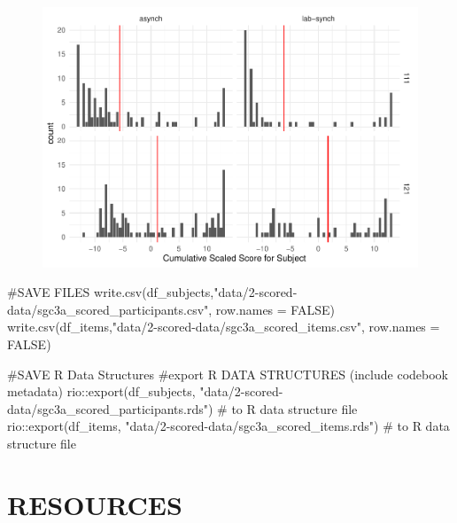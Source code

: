 \documentclass[
  letterpaper,
  DIV=11,
  numbers=noendperiod]{scrreprt}
\newenvironment{Shaded}{\begin{snugshade}}{\end{snugshade}}
\newcommand{\AttributeTok}[1]{\textcolor[rgb]{0.40,0.45,0.13}{#1}}
\newcommand{\CommentTok}[1]{\textcolor[rgb]{0.37,0.37,0.37}{#1}}
\newcommand{\ConstantTok}[1]{\textcolor[rgb]{0.56,0.35,0.01}{#1}}
\newcommand{\FunctionTok}[1]{\textcolor[rgb]{0.28,0.35,0.67}{#1}}
\newcommand{\NormalTok}[1]{\textcolor[rgb]{0.00,0.23,0.31}{#1}}
\newcommand{\SpecialCharTok}[1]{\textcolor[rgb]{0.37,0.37,0.37}{#1}}
\newcommand{\StringTok}[1]{\textcolor[rgb]{0.13,0.47,0.30}{#1}}
\begin{document}
\begin{figure}[H]

{\centering \includegraphics{analysis/SGC3A/2_sgc3A_scoring_files/figure-pdf/unnamed-chunk-92-1.pdf}

}

\end{figure}

\begin{Shaded}
\begin{Highlighting}[]
\CommentTok{\#SAVE FILES}
\FunctionTok{write.csv}\NormalTok{(df\_subjects,}\StringTok{"data/2{-}scored{-}data/sgc3a\_scored\_participants.csv"}\NormalTok{, }\AttributeTok{row.names =} \ConstantTok{FALSE}\NormalTok{)}
\FunctionTok{write.csv}\NormalTok{(df\_items,}\StringTok{"data/2{-}scored{-}data/sgc3a\_scored\_items.csv"}\NormalTok{, }\AttributeTok{row.names =} \ConstantTok{FALSE}\NormalTok{)}


\CommentTok{\#SAVE R Data Structures }
\CommentTok{\#export R DATA STRUCTURES (include codebook metadata)}
\NormalTok{rio}\SpecialCharTok{::}\FunctionTok{export}\NormalTok{(df\_subjects, }\StringTok{"data/2{-}scored{-}data/sgc3a\_scored\_participants.rds"}\NormalTok{) }\CommentTok{\# to R data structure file}
\NormalTok{rio}\SpecialCharTok{::}\FunctionTok{export}\NormalTok{(df\_items, }\StringTok{"data/2{-}scored{-}data/sgc3a\_scored\_items.rds"}\NormalTok{) }\CommentTok{\# to R data structure file}
\end{Highlighting}
\end{Shaded}

\hypertarget{resources-1}{%
\section{RESOURCES}\label{resources-1}}
\end{document}
